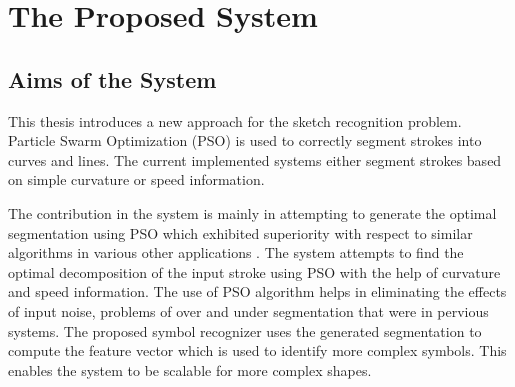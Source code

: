 \chapter{The Proposed System}
\label{sec:proposedSystem}
\section{Aims of the System}
\label{sec:AimsOfTheSystem}
This thesis introduces a new approach for the sketch recognition problem. Particle Swarm Optimization (PSO) is used to correctly segment strokes into curves and lines. The current implemented systems either segment strokes based on simple curvature\cite{meanshift10,earlySketchbased4} or speed information\cite{earlySketchbased4}.


The contribution in the system is mainly in attempting to generate the optimal segmentation using PSO which exhibited superiority with respect to similar algorithms in various other applications \cite{PolygonApproximationPSO}. The system attempts to find the optimal decomposition of the input stroke using PSO with the help of curvature and speed information. The use of PSO algorithm helps in eliminating the effects of input noise, problems of over and under segmentation that were in pervious systems. The proposed symbol recognizer uses the generated segmentation to compute the feature vector which is used to identify more complex symbols. This enables the system to be scalable for more  complex shapes.




